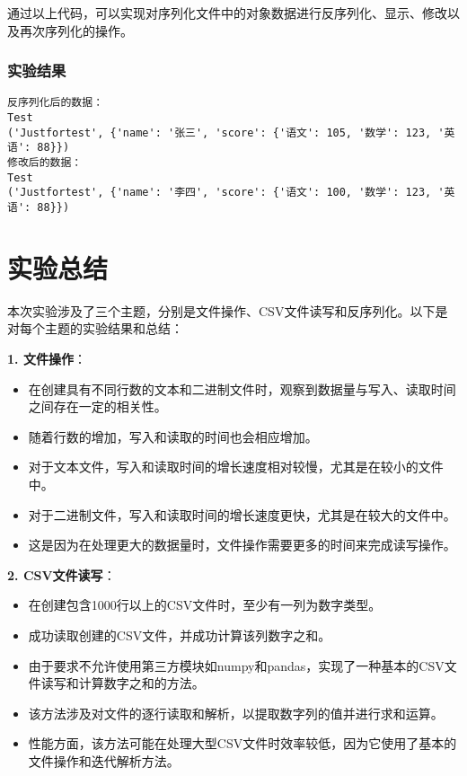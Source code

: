 \documentclass[lang=cn,11pt,a4paper]{elegantpaper}
\begin{document}
通过以上代码，可以实现对序列化文件中的对象数据进行反序列化、显示、修改以及再次序列化的操作。

\subsubsection{实验结果}
\begin{lstlisting}[language=text]
反序列化后的数据：
Test
('Justfortest', {'name': '张三', 'score': {'语文': 105, '数学': 123, '英语': 88}})
修改后的数据：
Test
('Justfortest', {'name': '李四', 'score': {'语文': 100, '数学': 123, '英语': 88}})
\end{lstlisting}

\section{实验总结}

本次实验涉及了三个主题，分别是文件操作、CSV文件读写和反序列化。以下是对每个主题的实验结果和总结：

\textbf{1. 文件操作}：
\begin{itemize}
   \item 在创建具有不同行数的文本和二进制文件时，观察到数据量与写入、读取时间之间存在一定的相关性。
   \item 随着行数的增加，写入和读取的时间也会相应增加。
   \item 对于文本文件，写入和读取时间的增长速度相对较慢，尤其是在较小的文件中。
   \item 对于二进制文件，写入和读取时间的增长速度更快，尤其是在较大的文件中。
   \item 这是因为在处理更大的数据量时，文件操作需要更多的时间来完成读写操作。
\end{itemize}

\textbf{2. CSV文件读写}：
\begin{itemize}
   \item 在创建包含1000行以上的CSV文件时，至少有一列为数字类型。
   \item 成功读取创建的CSV文件，并成功计算该列数字之和。
   \item 由于要求不允许使用第三方模块如numpy和pandas，实现了一种基本的CSV文件读写和计算数字之和的方法。
   \item 该方法涉及对文件的逐行读取和解析，以提取数字列的值并进行求和运算。
   \item 性能方面，该方法可能在处理大型CSV文件时效率较低，因为它使用了基本的文件操作和迭代解析方法。
\end{itemize}
\end{document}
